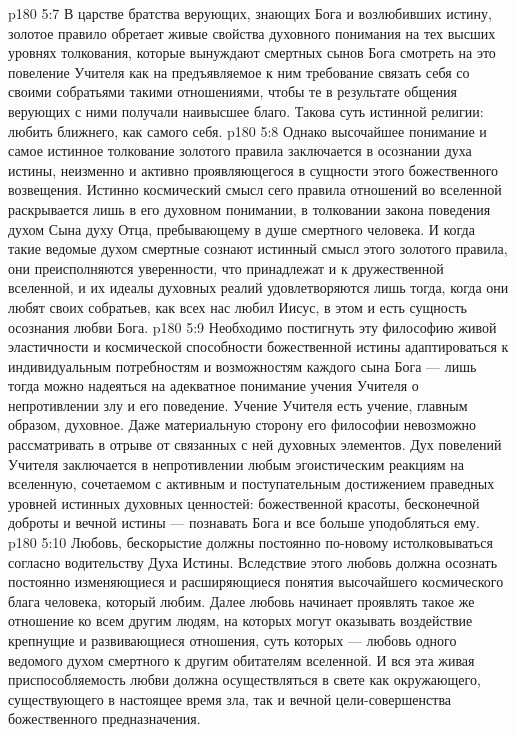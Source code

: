 \vs p180 5:7 В царстве братства верующих, знающих Бога и возлюбивших истину, золотое правило обретает живые свойства духовного понимания на тех высших уровнях толкования, которые вынуждают смертных сынов Бога смотреть на это повеление Учителя как на предъявляемое к ним требование связать себя со своими собратьями такими отношениями, чтобы те в результате общения верующих с ними получали наивысшее благо. Такова суть истинной религии: любить ближнего, как самого себя.
\vs p180 5:8 Однако высочайшее понимание и самое истинное толкование золотого правила заключается в осознании духа истины, неизменно и активно проявляющегося в сущности этого божественного возвещения. Истинно космический смысл сего правила отношений во вселенной раскрывается лишь в его духовном понимании, в толковании закона поведения духом Сына духу Отца, пребывающему в душе смертного человека. И когда такие ведомые духом смертные сознают истинный смысл этого золотого правила, они преисполняются уверенности, что принадлежат и к дружественной вселенной, и их идеалы духовных реалий удовлетворяются лишь тогда, когда они любят своих собратьев, как всех нас любил Иисус, в этом и есть сущность осознания любви Бога.
\vs p180 5:9 Необходимо постигнуть эту философию живой эластичности и космической способности божественной истины адаптироваться к индивидуальным потребностям и возможностям каждого сына Бога --- лишь тогда можно надеяться на адекватное понимание учения Учителя о непротивлении злу и его поведение. Учение Учителя есть учение, главным образом, духовное. Даже материальную сторону его философии невозможно рассматривать в отрыве от связанных с ней духовных элементов. Дух повелений Учителя заключается в непротивлении любым эгоистическим реакциям на вселенную, сочетаемом с активным и поступательным достижением праведных уровней истинных духовных ценностей: божественной красоты, бесконечной доброты и вечной истины --- познавать Бога и все больше уподобляться ему.
\vs p180 5:10 Любовь, бескорыстие должны постоянно по\hyp{}новому истолковываться согласно водительству Духа Истины. Вследствие этого любовь должна осознать постоянно изменяющиеся и расширяющиеся понятия высочайшего космического блага человека, который любим. Далее любовь начинает проявлять такое же отношение ко всем другим людям, на которых могут оказывать воздействие крепнущие и развивающиеся отношения, суть которых --- любовь одного ведомого духом смертного к другим обитателям вселенной. И вся эта живая приспособляемость любви должна осуществляться в свете как окружающего, существующего в настоящее время зла, так и вечной цели\hyp{}совершенства божественного предназначения.
